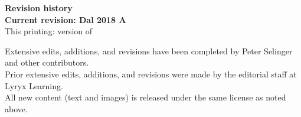 \thispagestyle{empty}


\setlength{\parskip}{0pt}

\begin{center}
  \fontsize{14pt}{16pt}\selectfont\textcolor{titletextcolour}{\textbf{Revision history \\ \smallskip  Current revision: Dal 2018 A}}
  \\\bigskip\fontsize{10pt}{12pt}\selectfont\textcolor{titletextcolour}{This
    printing: version {\revid} of {\revdate}}
\end{center}

{\footnotesize

  \begin{center}
    Extensive edits, additions, and revisions have been completed by
    Peter Selinger and other contributors. \\
    Prior extensive edits, additions, and revisions were made by the
    editorial staff at Lyryx Learning. \\
    All new content (text and images) is released under the same
    license as noted above.
  \end{center}

}
